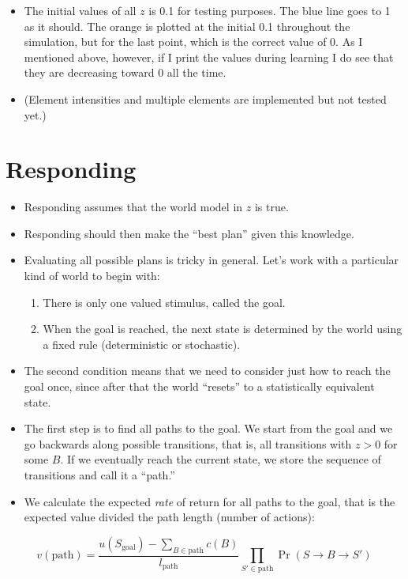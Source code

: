 \documentclass[11pt]{article}
\begin{document}
\begin{itemize}
\item The initial values of all \(z\) is 0.1 for testing purposes. The blue
line goes to 1 as it should. The orange is plotted at the initial
0.1 throughout the simulation, but for the last point, which is the
correct value of 0. As I mentioned above, however, if I print the
values during learning I do see that they are decreasing toward 0
all the time.

\item (Element intensities and multiple elements are implemented but not
tested yet.)
\end{itemize}

\section{Responding}
\label{sec:orgf30a6be}

\begin{itemize}
\item Responding assumes that the world model in \(z\) is true.

\item Responding should then make the ``best plan'' given this
knowledge.

\item Evaluating all possible plans is tricky in general. Let's work with
a particular kind of world to begin with:
\begin{enumerate}
\item There is only one valued stimulus, called the goal.
\item When the goal is reached, the next state is determined by the
world using a fixed rule (deterministic or stochastic).
\end{enumerate}

\item The second condition means that we need to consider just how to
reach the goal once, since after that the world ``resets'' to a
statistically equivalent state.

\item The first step is to find all paths to the goal. We start from the
goal and we go backwards along possible transitions, that is, all
transitions with \(z>0\) for some \(B\). If we eventually reach the
current state, we store the sequence of transitions and call it a
``path.''

\item We calculate the expected \emph{rate} of return for all paths to the
goal, that is the expected value divided the path length (number of
actions):
\end{itemize}
\begin{equation}
  \label{eq:path-value}
  v(\mathrm{path}) = \frac{ u(S_\mathrm{goal}) -\sum_{B\in\mathrm{path}} c(B)}{ l_\mathrm{path} } \prod_{S'\in\mathrm{path}} \Pr(S\to B\to S') 
\end{equation}
\end{document}
